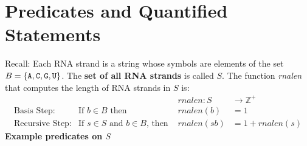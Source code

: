 \documentclass[12pt, oneside]{article}
\begin{document}
\section*{Predicates and Quantified Statements}

Recall: Each RNA strand is a string whose symbols are elements of the set $B  = \{\texttt{A}, \texttt{C}, \texttt{G}, \texttt{U} \}$.
The {\bf set of all RNA strands} is called $S$.
The function \textit{rnalen} that computes the length of RNA strands in $S$ is:
\[
\begin{array}{llll}
& & \textit{rnalen} : S & \to \mathbb{Z}^+ \\
\textrm{Basis Step:} & \textrm{If } b \in B\textrm{ then } & \textit{rnalen}(b) & = 1 \\
\textrm{Recursive Step:} & \textrm{If } s \in S\textrm{ and }b \in B\textrm{, then  } & \textit{rnalen}(sb) & = 1 + \textit{rnalen}(s)
\end{array}
\]
{\bf Example predicates on $S$}

\vspace{-20pt}
\end{document}
